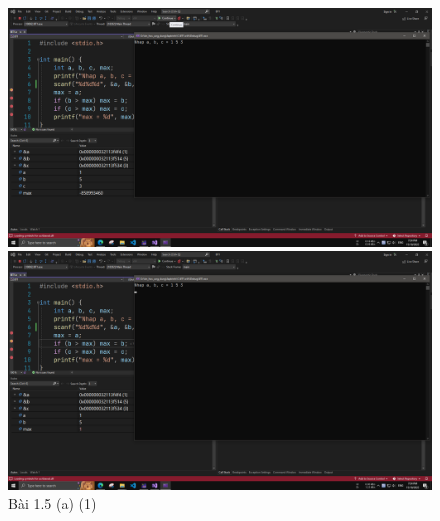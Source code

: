 \documentclass[a4paper, 12pt, notitlepage]{article}
\begin{document}
	\begin{figure}[h]
		\begin{center}
			\includegraphics[scale=0.28]{Screenshot (1359).png}
		\end{center}
		\begin{center}
			\includegraphics[scale=0.28]{Screenshot (1360).png}
		\end{center}
		\caption{Bài 1.5 (a) (1)}
	\end{figure}
\end{document}
